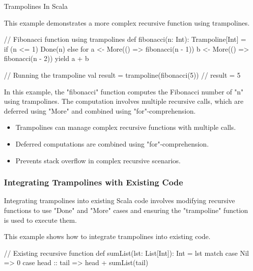 \begin{notes}{Trampolines In Scala}
    \begin{highlight}
    
        This example demonstrates a more complex recursive function using trampolines.
    
    \begin{code}[Scala]
    // Fibonacci function using trampolines
    def fibonacci(n: Int): Trampoline[Int] =
        if (n <= 1) Done(n)
        else for {
            a <- More(() => fibonacci(n - 1))
            b <- More(() => fibonacci(n - 2))
        } yield a + b
    
    // Running the trampoline
    val result = trampoline(fibonacci(5))  // result = 5
    \end{code}
    
        In this example, the "fibonacci" function computes the Fibonacci number of "n" using trampolines. The computation involves multiple recursive calls, which are deferred using "More" and 
        combined using "for"-comprehension.
    
        \begin{itemize}
            \item Trampolines can manage complex recursive functions with multiple calls.
            \item Deferred computations are combined using "for"-comprehension.
            \item Prevents stack overflow in complex recursive scenarios.
        \end{itemize}
    
    \end{highlight}
    
    \subsubsection*{Integrating Trampolines with Existing Code}
    
    Integrating trampolines into existing Scala code involves modifying recursive functions to use "Done" and "More" cases and ensuring the "trampoline" function is used to execute them.
    
    \begin{highlight}
    
        This example shows how to integrate trampolines into existing code.
    
    \begin{code}[Scala]
    // Existing recursive function
    def sumList(lst: List[Int]): Int =
        lst match {
            case Nil => 0
            case head :: tail => head + sumList(tail)
        }
    

\end{code}
\end{highlight}
\end{notes}
